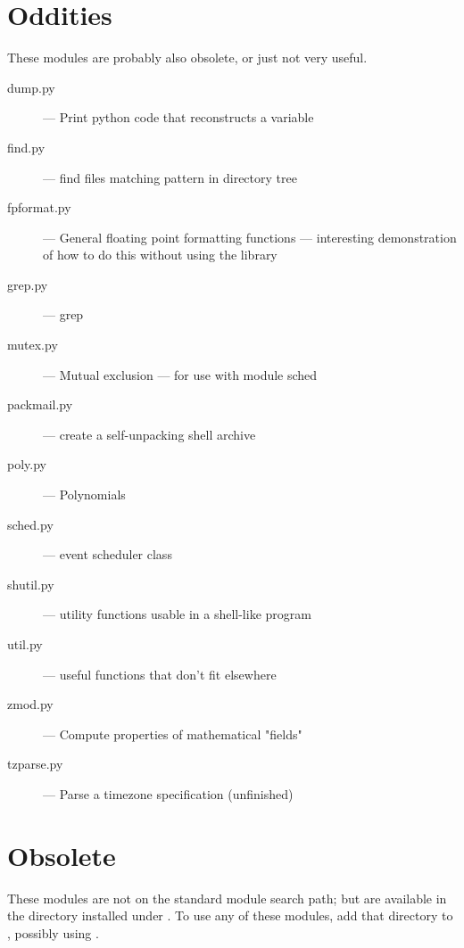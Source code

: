 \section{Oddities}

These modules are probably also obsolete, or just not very useful.

\begin{description}
\item[dump.py]
--- Print python code that reconstructs a variable

\item[find.py]
--- find files matching pattern in directory tree

\item[fpformat.py]
--- General floating point formatting functions ---
interesting demonstration of how to do this without using the \C{}
library

\item[grep.py]
--- grep

\item[mutex.py]
--- Mutual exclusion --- for use with module sched

\item[packmail.py]
--- create a self-unpacking \UNIX{} shell archive

\item[poly.py]
--- Polynomials

\item[sched.py]
--- event scheduler class

\item[shutil.py]
--- utility functions usable in a shell-like program

\item[util.py]
--- useful functions that don't fit elsewhere

\item[zmod.py]
--- Compute properties of mathematical "fields"

\item[tzparse.py]
--- Parse a timezone specification (unfinished)
\end{description}


\section{Obsolete}

These modules are not on the standard module search path;
but are available in the directory  installed  under
. %
To use any of these modules, add that directory to ,
possibly using .

